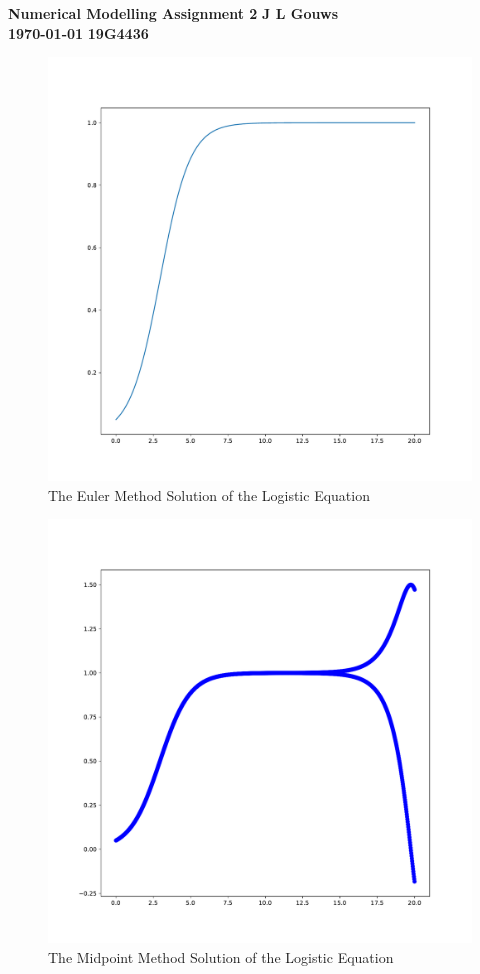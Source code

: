 \documentclass[a4paper,12pt]{article}
\newcommand\block[1]{\hspace*{#1}}
\begin{document}
\thispagestyle{empty}

{\Large \textbf{Numerical Modelling Assignment 2}} \hfill {\Large \textbf{J L Gouws}}\\
\block{1.0cm} {\large \textbf{\today}} \hfill {\large \textbf{19G4436}}\\
\begin{figure}[!h]
  \centering
  \includegraphics[scale = 0.5]{1a.pdf}
  \caption{The Euler Method Solution of the Logistic Equation}
  \label{fig:eulerLogistic}
\end{figure}

\begin{figure}[!h]
  \centering
  \includegraphics[scale = 0.5]{1b.pdf}
  \caption{The Midpoint Method Solution of the Logistic Equation}
  \label{fig:eulerLogistic}
\end{figure}
\end{document}
